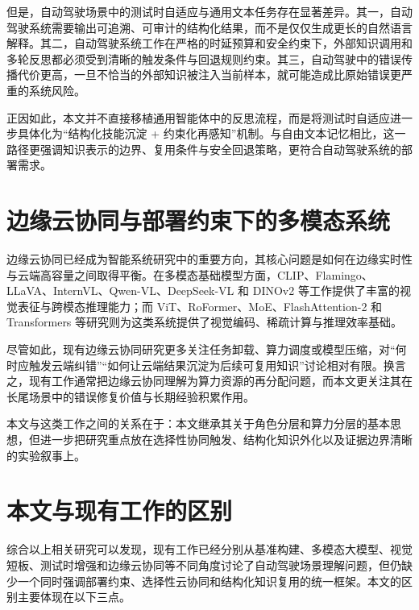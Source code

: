 但是，自动驾驶场景中的测试时自适应与通用文本任务存在显著差异。其一，自动驾驶系统需要输出可追溯、可审计的结构化结果，而不是仅仅生成更长的自然语言解释。其二，自动驾驶系统工作在严格的时延预算和安全约束下，外部知识调用和多轮反思都必须受到清晰的触发条件与回退规则约束。其三，自动驾驶中的错误传播代价更高，一旦不恰当的外部知识被注入当前样本，就可能造成比原始错误更严重的系统风险。

正因如此，本文并不直接移植通用智能体中的反思流程，而是将测试时自适应进一步具体化为“结构化技能沉淀 + 约束化再感知”机制。与自由文本记忆相比，这一路径更强调知识表示的边界、复用条件与安全回退策略，更符合自动驾驶系统的部署需求。

\section{边缘云协同与部署约束下的多模态系统}
\label{sec:related-system}

边缘云协同已经成为智能系统研究中的重要方向，其核心问题是如何在边缘实时性与云端高容量之间取得平衡\cite{xie2025vlmsreadyad,chen2025automatedevaluationcornercases}。在多模态基础模型方面，CLIP、Flamingo、LLaVA、InternVL、Qwen-VL、DeepSeek-VL 和 DINOv2 等工作提供了丰富的视觉表征与跨模态推理能力\cite{radford2021clip,alayrac2022flamingo,liu2023visualinstructiontuning,chen2024internvl,zhu2025internvl3,bai2023qwenvl,wang2024qwen2vl,bai2025qwen25vl,lu2024ovis,lu2024deepseekvl,wu2024deepseekvl2,oquab2024dinov2,tong2024cambrian1}；而 ViT、RoFormer、MoE、FlashAttention-2 和 Transformers 等研究则为这类系统提供了视觉编码、稀疏计算与推理效率基础\cite{dosovitskiy2021vit,su2024roformer,shazeer2017moe,dao2024flashattention2,wolf2020transformers}。

尽管如此，现有边缘云协同研究更多关注任务卸载、算力调度或模型压缩，对“何时应触发云端纠错”“如何让云端结果沉淀为后续可复用知识”讨论相对有限。换言之，现有工作通常把边缘云协同理解为算力资源的再分配问题，而本文更关注其在长尾场景中的错误修复价值与长期经验积累作用。

本文与这类工作之间的关系在于：本文继承其关于角色分层和算力分层的基本思想，但进一步把研究重点放在选择性协同触发、结构化知识外化以及证据边界清晰的实验叙事上。

\section{本文与现有工作的区别}
\label{sec:related-difference}

综合以上相关研究可以发现，现有工作已经分别从基准构建、多模态大模型、视觉短板、测试时增强和边缘云协同等不同角度讨论了自动驾驶场景理解问题，但仍缺少一个同时强调部署约束、选择性云协同和结构化知识复用的统一框架。本文的区别主要体现在以下三点。

